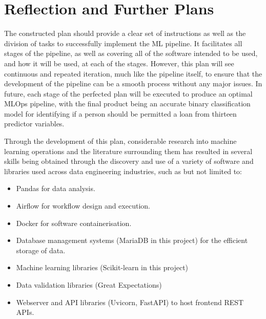 \documentclass[12pt]{report}
\begin{document}
\chapter{Reflection and Further Plans}
The constructed plan should provide a clear set of instructions as well as the division of tasks 
to successfully implement the ML pipeline. It facilitates all stages of the pipeline, as well as 
covering all of the software intended to be used, and how it will be used, at each of the stages.
However, this plan will see continuous and repeated iteration, much like the pipeline itself, to ensure 
that the development of the pipeline can be a smooth process without any major issues.
In future, each stage of the perfected plan will be executed to produce an optimal MLOps pipeline, with the final 
product being an accurate binary classification model for identifying if a person should be permitted a 
loan from thirteen predictor variables. 


Through the development of this plan, considerable research into machine learning operations and the literature 
surrounding them has resulted in several skills being obtained through the discovery and use of 
a variety of software and libraries used across data engineering industries, such as but not limited to:

\begin{itemize}
    \item Pandas for data analysis.
    \item Airflow for workflow design and execution.
    \item Docker for software containerisation.
    \item Database management systems (MariaDB in this project) for the efficient storage of data.
    \item Machine learning libraries (Scikit-learn in this project) 
    \item Data validation libraries (Great Expectations)
    \item Webserver and API libraries (Uvicorn, FastAPI) to host frontend REST APIs.
\end{itemize}






\printbibliography
\end{document}
